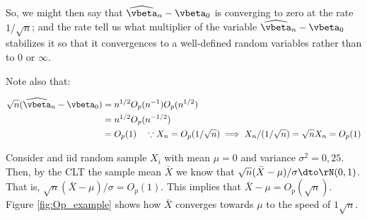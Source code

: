 \begin{example}
So, we might then say that $\widehat{\vbeta}_n - \vbeta_0$ is converging to zero at the rate $1/\sqrt{n}$; and the rate tell us what multiplier of the variable $\widehat{\vbeta}_n - \vbeta_0$ stabilizes it so that it convergences to a well-defined random variables rather than to 0 or $\infty$. 

Note also that: 

\begin{equation*}
  \begin{aligned}
    \sqrt{n}(\widehat{\vbeta}_n - \vbeta_0) & =  n^{1/2}O_p(n^{-1})O_p(n^{1/2})\\
    & = n^{1/2} O_p(n^{-1/2}) \\
    & = O_p(1) \quad \because X_n = O_p(1/\sqrt{n}) \implies X_n / (1/\sqrt{n})= \sqrt{n} X_n = O_p(1) 
  \end{aligned}
\end{equation*}
\end{example}

\begin{example}
Consider and iid random sample $X_i$ with mean $\mu = 0$ and variance $\sigma^2 = 0,25$. Then, by the CLT the sample mean $\bar{X}$ we know that $\sqrt{n}(\bar{X}-\mu) /\sigma \dto \rN(0 , 1)$. That is, $\sqrt{n}(\bar{X}-\mu)/\sigma = O_p(1)$. This implies that $\bar{X} - \mu= O_p(\sqrt{n})$. Figure \ref{fig:Op_example} shows how $\bar{X}$ converges towards $\mu$ to the speed of $1\sqrt{n}$.
\end{example}


